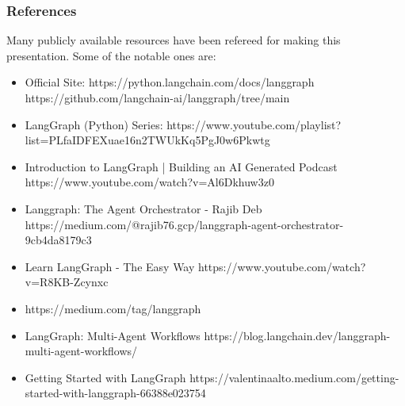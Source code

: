 \begin{frame}\frametitle{References}
Many publicly available resources have been refereed for making this presentation. Some of the notable ones are:
\footnotesize
\begin{itemize}
\item Official Site: https://python.langchain.com/docs/langgraph https://github.com/langchain-ai/langgraph/tree/main
\item LangGraph (Python) Series: https://www.youtube.com/playlist?list=PLfaIDFEXuae16n2TWUkKq5PgJ0w6Pkwtg
\item Introduction to LangGraph | Building an AI Generated Podcast https://www.youtube.com/watch?v=Al6Dkhuw3z0
\item Langgraph: The Agent Orchestrator - Rajib Deb https://medium.com/@rajib76.gcp/langgraph-agent-orchestrator-9cb4da8179c3
\item Learn LangGraph - The Easy Way https://www.youtube.com/watch?v=R8KB-Zcynxc
\item https://medium.com/tag/langgraph
\item LangGraph: Multi-Agent Workflows https://blog.langchain.dev/langgraph-multi-agent-workflows/
\item Getting Started with LangGraph https://valentinaalto.medium.com/getting-started-with-langgraph-66388e023754
\end{itemize}

\end{frame}